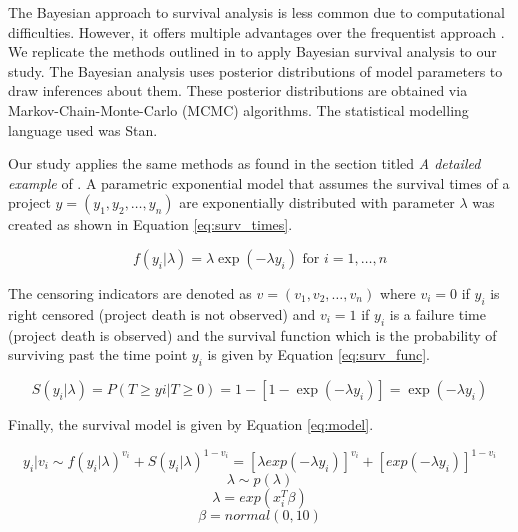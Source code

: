 \documentclass[acmconf]{acmart}
\begin{document}
The Bayesian approach to survival analysis is less common due to computational difficulties. 
However, it offers multiple advantages over the frequentist approach \cite{kelter2020bayesian}. 
We replicate the methods outlined in \cite{kelter2020bayesian} to apply Bayesian survival analysis to our study. 
The Bayesian analysis uses posterior distributions of model parameters to draw inferences about them. 
These posterior distributions are obtained via Markov-Chain-Monte-Carlo (MCMC) algorithms. 
The statistical modelling language used was Stan.

Our study applies the same methods as found in the section titled \emph{A detailed example} of \cite{kelter2020bayesian}. 
A parametric exponential model that assumes the survival times of a project $y = (y_1, y_2, \dots, y_n)$ are exponentially distributed with parameter $\lambda$ was created as shown in Equation \ref{eq:surv_times}.

\begin{equation} \label{eq:surv_times}
    f(y_i|\lambda) = \lambda\exp(- \lambda y_i) \mbox{ for } i=1,\dots,n
\end{equation}

The censoring indicators are denoted as $v = (v_1, v_2,\dots, v_n)$ where $v_i = 0$ if $y_i$ is right censored (project death is not observed) and $v_i = 1$ if $y_i$ is a failure time (project death is observed) and the survival function which is the probability of surviving past the time point $y_i$ is given by Equation \ref{eq:surv_func}.

\begin{equation} \label{eq:surv_func}
    S(y_i|\lambda) = P(T \geq yi|T \geq 0) = 1 - [1 - \exp(-  \lambda y_i)] = \exp(- \lambda y_i)
\end{equation}

Finally, the survival model is given by Equation \ref{eq:model}.

\begin{equation} \label{eq:model}
    y_i|v_i \sim f(y_i| \lambda)^{v_i} + S(y_i| \lambda)^{1-v_i} = [\lambda exp(-  \lambda y_i)]^{v_i} + [exp(-  \lambda y_i)]^{1-v_i}
\end{equation}
\begin{equation}
    \lambda \sim p(\lambda)
\end{equation}
\begin{equation}
    \lambda = exp(x_i^T \beta)
\end{equation}
\begin{equation}
    \beta = normal(0, 10)
\end{equation}
\end{document}
